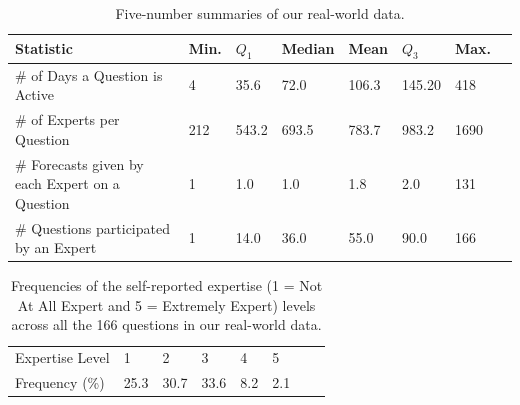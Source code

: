 \documentclass[aoas, preprint]{imsart}
\numberwithin{equation}{section}
\theoremstyle{plain}
\begin{document}
\begin{table}
\caption{Five-number summaries of our real-world data.}
\label{DataStats}
\begin{tabular}{m{2in}	lllllll }
\hline
Statistic & Min. & $Q_1$ & Median & Mean & $Q_3$ & Max.\\ \hline
\# of Days a Question is Active  & 4 &  35.6 &  72.0 & 106.3 & 145.20 & 418 \\
\# of Experts per Question & 212 &   543.2 &  693.5 &  783.7 &  983.2 & 1690\\ 
\# Forecasts given by each Expert on a Question & 1 &  1.0 &   1.0  &  1.8 &  2.0 & 131 \\
\# Questions participated by an Expert & 1 &  14.0 &   36.0  &  55.0 &  90.0 & 166 \\ \hline
\end{tabular}
\end{table}


\begin{table}
\caption{Frequencies of the self-reported expertise (1 = Not At All Expert and 5 = Extremely Expert) levels across all the 166 questions in our real-world data.}
\label{ExpertiseTable}
\begin{center}
\begin{tabular}{llllllll }
\hline
Expertise Level & 1 & 2 & 3 & 4 & 5\\
Frequency (\%) & 25.3 & 30.7 & 33.6 &  8.2 &  2.1 \\\hline
\end{tabular}
\end{center}
\end{table}
\end{document}
